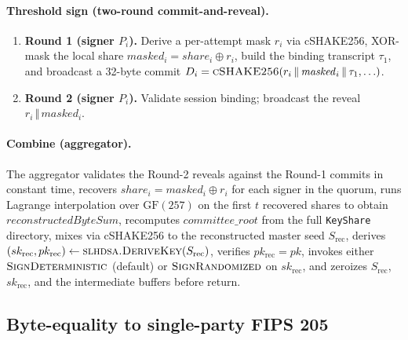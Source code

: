 \paragraph{Threshold sign (two-round commit-and-reveal).}
\begin{enumerate}[leftmargin=2em,nosep]
  \item \textbf{Round 1 (signer $P_i$).} Derive a per-attempt mask
        $r_i$ via cSHAKE256, XOR-mask the local share
        $\mathit{masked}_i = \mathit{share}_i \oplus r_i$, build
        the binding transcript $\tau_1$, and broadcast a 32-byte
        commit $D_i = \textsc{cSHAKE256}(r_i \,\Vert\,
        \mathit{masked}_i \,\Vert\, \tau_1, \ldots)$.
  \item \textbf{Round 2 (signer $P_i$).} Validate session binding;
        broadcast the reveal $r_i \,\Vert\, \mathit{masked}_i$.
\end{enumerate}

\paragraph{Combine (aggregator).} The aggregator validates the
Round-2 reveals against the Round-1 commits in constant time,
recovers $\mathit{share}_i = \mathit{masked}_i \oplus r_i$ for
each signer in the quorum, runs Lagrange interpolation over
$\mathrm{GF}(257)$ on the first $t$ recovered shares to obtain
$\mathit{reconstructedByteSum}$, recomputes
$\mathit{committee\_root}$ from the full
\texttt{KeyShare} directory, mixes via cSHAKE256 to the
reconstructed master seed
$S_{\mathrm{rec}}$, derives $(sk_{\mathrm{rec}},
pk_{\mathrm{rec}}) \gets \textsc{slhdsa.DeriveKey}(S_{\mathrm{rec}})$,
verifies $pk_{\mathrm{rec}} = pk$, invokes either
$\textsc{SignDeterministic}$ (default) or
$\textsc{SignRandomized}$ on $sk_{\mathrm{rec}}$, and zeroizes
$S_{\mathrm{rec}}$, $sk_{\mathrm{rec}}$, and the intermediate
buffers before return.

\subsection{Byte-equality to single-party FIPS 205}
\label{app:reveal:byteequal}

